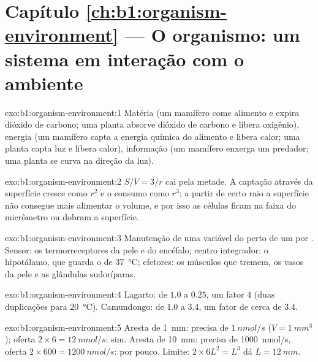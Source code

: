 \section*{Capítulo \ref{ch:b1:organism-environment} --- O organismo: um sistema em interação com o ambiente}

\begin{solution}{exo:b1:organism-environment:1}
Matéria (um mamífero come alimento e expira dióxido de carbono; uma
planta absorve dióxido de carbono e libera oxigênio), energia (um
mamífero capta a energia química do alimento e libera calor; uma planta
capta luz e libera calor), informação (um mamífero enxerga um predador;
uma planta se curva na direção da luz).
\end{solution}

\begin{solution}{exo:b1:organism-environment:2}
$S/V = 3/r$ cai pela metade. A captação através da superfície cresce
como $r^2$ e o consumo como $r^3$; a partir de certo raio a superfície
não consegue mais alimentar o volume, e por isso as células ficam na
faixa do micrômetro ou dobram a superfície.
\end{solution}

\begin{solution}{exo:b1:organism-environment:3}
Manutenção de uma variável do  perto de um  por . Sensor: os termorreceptores da
pele e do encéfalo; centro integrador: o hipotálamo, que guarda o  de \qty{37}{\celsius}; efetores: os músculos que tremem,
os vasos da pele e as glândulas sudoríparas.
\end{solution}

\begin{solution}{exo:b1:organism-environment:4}
Lagarto: de $1.0$ a $0.25$, um fator $4$ (duas duplicações para
\qty{20}{\celsius}). Camundongo: de $1.0$ a $3.4$, um fator de cerca de
$3.4$.
\end{solution}

\begin{solution}{exo:b1:organism-environment:5}
Aresta de \qty{1}{mm}: precisa de $\qty{1}{nmol/s}$
($V = \qty{1}{mm^3}$); oferta $2\times 6 = \qty{12}{nmol/s}$: sim.
Aresta de \qty{10}{mm}: precisa de \qty{1000}{nmol/s}, oferta
$2\times 600 = \qty{1200}{nmol/s}$: por pouco. Limite:
$2\times 6L^2 = L^3$ dá $L = \qty{12}{mm}$.
\end{solution}

